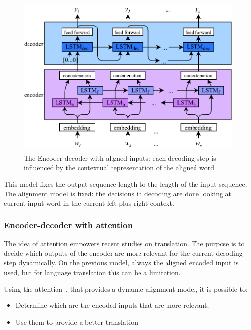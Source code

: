\begin{figure}[!htbp]
    \centering
    \includegraphics[max width=\linewidth,max height=8cm,keepaspectratio]{figures/encoderDecoderAligned}
    \caption{The Encoder-decoder with aligned inputs: each decoding step is influenced by the contextual representation of the aligned word}\label{fig:encoderDecoderAligned}
\end{figure}

This model fixes the output sequence length to the length of the input sequence. The alignment model is fixed: the decisions in decoding are done looking at current input word in the current left plus right context.

\subsubsection{Encoder-decoder with attention}
\label{sequenceAttention}

The idea of attention empowers recent studies on translation. The purpose is to decide which outputs of the encoder are more relevant for the current decoding step dynamically. On the previous model, always the aligned encoded input is used, but for language translation this can be a limitation.

Using the attention~\cite{bahdanau2014neural}, that provides a dynamic alignment model, it is possible to:

\begin{itemize}
	\item Determine which are the encoded inputs that are more relevant;

	\item Use them to provide a better translation.
\end{itemize}

